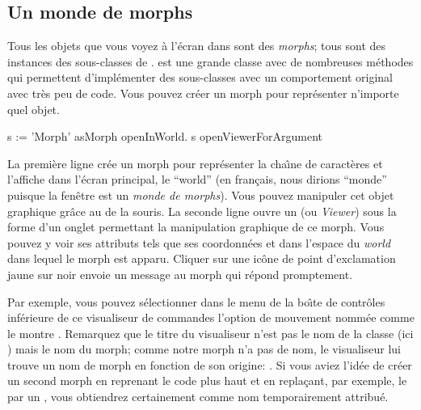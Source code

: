 \documentclass[a4paper,10pt,twoside]{book}
\begin{document}
\subsection{Un monde de morphs}
Tous les objets que vous voyez \`a l'\'ecran dans \sq sont des
\emph{morphs}; tous sont des instances des sous-classes de .
\mbox{} est une grande classe avec de nombreuses m\'ethodes
qui permettent d'impl\'ementer des sous-classes avec un comportement
original avec tr\`es peu de code.
Vous pouvez cr\'eer un morph pour repr\'esenter n'importe quel objet. 


\begin{code}{}
s := 'Morph' asMorph openInWorld.
s openViewerForArgument
\end{code}

La premi\`ere ligne cr\'ee un morph pour repr\'esenter la cha\^{\i}ne
de caract\`eres  et l'affiche dans
l'\'ecran principal, le ``world'' (en fran\c{c}ais, nous dirions
``monde'' puisque la fen\^etre \sq est un \emph{monde de morphs}).
Vous pouvez manipuler cet objet graphique gr\^ace au 
de la souris.
La seconde ligne ouvre un  (ou
\emph{Viewer}) sous la forme d'un onglet
permettant la manipulation graphique de ce morph. Vous pouvez y voir
ses attributs tels que ses coordonn\'ees  et  dans
l'espace du \emph{world} dans lequel le morph est apparu.
Cliquer sur une ic\^one de point d'exclamation jaune sur noir envoie un
message au morph qui r\'epond promptement.

Par exemple, vous pouvez s\'electionner dans le menu de la bo\^{\i}te de
contr\^oles inf\'erieure de ce visualiseur de commandes l'option de
mouvement nomm\'ee  comme le montre .
Remarquez que le titre du visualiseur n'est pas le nom de la classe
(ici \mbox{)} mais le nom du morph; comme notre morph n'a pas
de nom, le visualiseur lui trouve un nom de morph en fonction de son
origine: . Si vous aviez l'id\'ee de cr\'eer un second
morph en reprenant le code plus haut et en repla\c{c}ant, par exemple,
le  par un , vous obtiendrez certainement  comme nom
temporairement attribu\'e.
\end{document}
